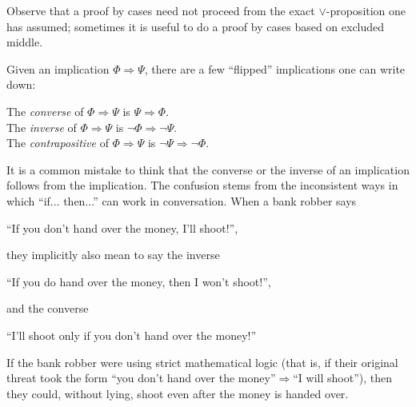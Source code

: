 \documentclass[12pt]{article}
\newcommand{\AND}{\wedge}
\newcommand{\OR}{\vee}
\newcommand{\ARR}{\Rightarrow}
\newcommand{\DARR}{\Leftrightarrow}
\newcounter{exercise}
\newcounter{rule}
\def\putExerciseHeading{\refstepcounter{exercise} \textbf{Exercise \theexercise}}
\def\putRuleNumber{\refstepcounter{rule}\therule}
\newcommand{\indented}[1]{\begin{adjustwidth}{1em}{}#1\end{adjustwidth}}
\newcommand{\DRULEPF}[3]{\begin{tcolorbox}[title=Derived Rule \putRuleNumber: #1,colbacktitle=white,coltitle=black,colback=white] {#2} \tcblower \textbf{Proof:} {#3} \end{tcolorbox}}
\newcommand{\DRULEPZ}[2]{\begin{tcolorbox}[title=Derived Rule \putRuleNumber: #1,colbacktitle=white,coltitle=black,colback=white] {#2} \tcblower \textbf{Proof:} 
                         \putExerciseHeading. \end{tcolorbox}}
\def\pA{\Phi}
\def\pB{\Psi}
\def\pC{\Omega}
\begin{document}
Observe that a proof by cases need not proceed from the exact $\OR$-proposition one has assumed;
sometimes it is useful to do a proof by cases based on excluded middle.

%
%
%










Given an implication $\pA\ARR\pB$, there are a few ``flipped'' implications one can write down:
\indented{The \emph{converse} of $\pA\ARR\pB$ is $\pB\ARR\pA$.\\
          The \emph{inverse} of $\pA\ARR\pB$ is $\neg\pA\ARR\neg\pB$.\\
          The \emph{contrapositive} of $\pA\ARR\pB$ is $\neg\pB\ARR\neg\pA$.}
It is a common mistake to think that the converse or the inverse of an implication follows from the implication.
The confusion stems from the inconsistent ways in which ``if... then...'' can work in conversation.
When a bank robber says
\begin{center}
``If you don't hand over the money, I'll shoot!'',
\end{center}
they implicitly also mean to say the inverse
\begin{center}
``If you do hand over the money, then I won't shoot!'',
\end{center}
and the converse
\begin{center}
``I'll shoot only if you don't hand over the money!''
\end{center}
If the bank robber were using strict mathematical logic (that is, if their original
threat took the form ``you don't hand over the money''$\ARR$``I will shoot''), then
they could, without lying, shoot even after the money is handed over.
\end{document}
